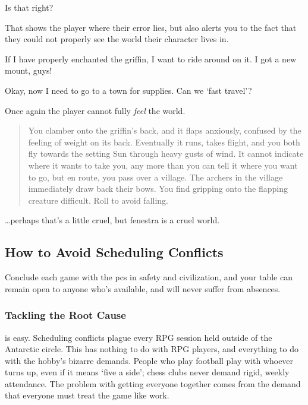 \begin{multicols}{2}
\begin{speechtext}
  Is that right?
\end{speechtext}

That shows the player where their error lies, but also alerts you to the fact that they could not properly see the world their character lives in.

\begin{boxtext}
  If I have properly enchanted the \gls{griffin}, I want to ride around on it.
  I got a new mount, guys!

  Okay, now I need to go to a town for supplies.
  Can we `fast travel'?
\end{boxtext}

Once again the player cannot fully \emph{feel} the world.

\null
\begin{quote}
  You clamber onto the \gls{griffin}'s back, and it flaps anxiously, confused by the feeling of weight on its back.
  Eventually it runs, takes flight, and you both fly towards the setting Sun through heavy gusts of wind.
  It cannot indicate where it wants to take you, any more than you can tell it where you want to go, but en route, you pass over a \gls{village}.
  The archers in the \gls{village} immediately draw back their bows.
  You find gripping onto the flapping creature difficult.
  Roll  to avoid falling.
\end{quote}

\ldots perhaps that's a little cruel, but \gls{fenestra} is a cruel world.

\subsection{How to Avoid Scheduling Conflicts}
\label{realtimeScheduling}

Conclude each game with the \glspl{pc} in safety and civilization, and your table can remain open to anyone who's available, and will never suffer from absences.

\subsubsection{Tackling the Root Cause}
is easy.
Scheduling conflicts plague every RPG session held outside of the Antarctic circle.
This has nothing to do with RPG players, and everything to do with the hobby's bizarre demands.
People who play football play with whoever turns up, even if it means `five a side'; chess clubs never demand rigid, weekly attendance.
The problem with getting everyone together comes from the demand that everyone must treat the game like work.


\end{multicols}
